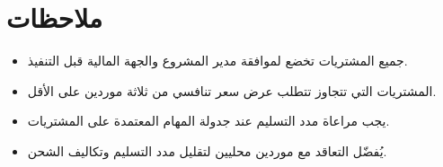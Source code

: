\documentclass[11pt,a4paper]{article}
\begin{document}
\section{ملاحظات}
\label{sec:notes}

\begin{itemize}
    \item جميع المشتريات تخضع لموافقة مدير المشروع والجهة المالية قبل التنفيذ.
    \item المشتريات التي تتجاوز  تتطلب عرض سعر تنافسي من ثلاثة موردين على الأقل.
    \item يجب مراعاة مدد التسليم عند جدولة المهام المعتمدة على المشتريات.
    \item يُفضّل التعاقد مع موردين محليين لتقليل مدد التسليم وتكاليف الشحن.
\end{itemize}
\end{document}
